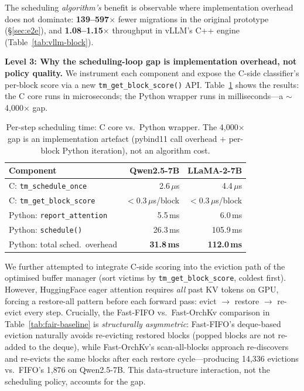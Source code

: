 \documentclass[conference]{IEEEtran}
\begin{document}
The scheduling \emph{algorithm's} benefit is observable where implementation overhead does not dominate: \textbf{139--597$\times$} fewer migrations in the original prototype (\S\ref{sec:e2e}), and \textbf{1.08--1.15$\times$} throughput in vLLM's C++ engine (Table~\ref{tab:vllm-block}).

\textbf{Level 3: Why the scheduling-loop gap is implementation overhead, not policy quality.} We instrument each component and expose the C-side classifier's per-block score via a new \texttt{tm\_get\_block\_score()} API.  Table~\ref{tab:sched-timing} shows the results: the C core runs in microseconds; the Python wrapper runs in milliseconds---a ${\sim}$4{,}000$\times$ gap.

\begin{table}[t]
\centering
\caption{Per-step scheduling time: C core vs.\ Python wrapper.  The 4{,}000$\times$ gap is an implementation artefact (pybind11 call overhead $+$ per-block Python iteration), not an algorithm cost.}
\label{tab:sched-timing}
\small
\begin{tabular}{@{}lrr@{}}
\toprule
Component & Qwen2.5-7B & LLaMA-2-7B \\
\midrule
C: \texttt{tm\_schedule\_once} & 2.6\,$\mu$s & 4.4\,$\mu$s \\
C: \texttt{tm\_get\_block\_score} & $<$0.3\,$\mu$s/block & $<$0.3\,$\mu$s/block \\
\midrule
Python: \texttt{report\_attention} & 5.5\,ms & 6.0\,ms \\
Python: \texttt{schedule()} & 26.3\,ms & 105.9\,ms \\
Python: total sched.\ overhead & \textbf{31.8\,ms} & \textbf{112.0\,ms} \\
\bottomrule
\end{tabular}
\end{table}

We further attempted to integrate C-side scoring into the eviction path of the optimised buffer manager (sort victims by \texttt{tm\_get\_block\_score}, coldest first).  However, HuggingFace eager attention requires \emph{all} past KV tokens on GPU, forcing a restore-all pattern before each forward pass: evict $\to$ restore $\to$ re-evict every step.  Crucially, the Fast-FIFO vs.\ Fast-OrchKv comparison in Table~\ref{tab:fair-baseline} is \emph{structurally asymmetric}: Fast-FIFO's deque-based eviction naturally avoids re-evicting restored blocks (popped blocks are not re-added to the deque), while Fast-OrchKv's scan-all-blocks approach re-discovers and re-evicts the same blocks after each restore cycle---producing 14{,}336 evictions vs.\ FIFO's 1{,}876 on Qwen2.5-7B. This data-structure interaction, not the scheduling policy, accounts for the gap.
\end{document}

